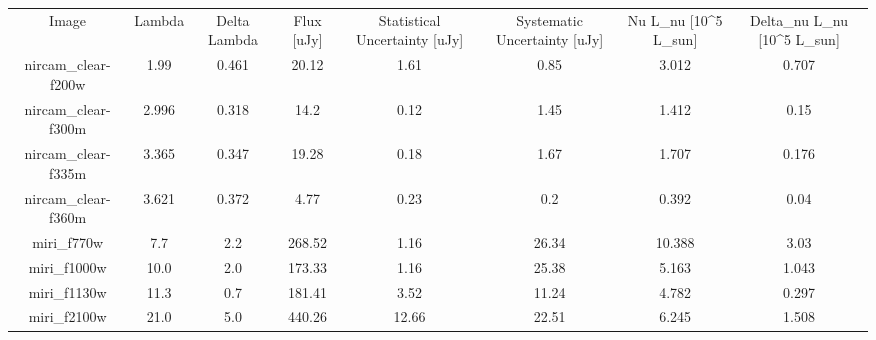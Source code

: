 \begin{table*}
\begin{tabular}{cccccccc}
Image & Lambda & Delta Lambda & Flux [uJy] & Statistical Uncertainty [uJy] & Systematic Uncertainty [uJy] & Nu L_nu [10^5 L_sun] & Delta_nu L_nu [10^5 L_sun] \\
nircam_clear-f200w & 1.99 & 0.461 & 20.12 & 1.61 & 0.85 & 3.012 & 0.707 \\
nircam_clear-f300m & 2.996 & 0.318 & 14.2 & 0.12 & 1.45 & 1.412 & 0.15 \\
nircam_clear-f335m & 3.365 & 0.347 & 19.28 & 0.18 & 1.67 & 1.707 & 0.176 \\
nircam_clear-f360m & 3.621 & 0.372 & 4.77 & 0.23 & 0.2 & 0.392 & 0.04 \\
miri_f770w & 7.7 & 2.2 & 268.52 & 1.16 & 26.34 & 10.388 & 3.03 \\
miri_f1000w & 10.0 & 2.0 & 173.33 & 1.16 & 25.38 & 5.163 & 1.043 \\
miri_f1130w & 11.3 & 0.7 & 181.41 & 3.52 & 11.24 & 4.782 & 0.297 \\
miri_f2100w & 21.0 & 5.0 & 440.26 & 12.66 & 22.51 & 6.245 & 1.508 \\
\end{tabular}
\end{table*}
